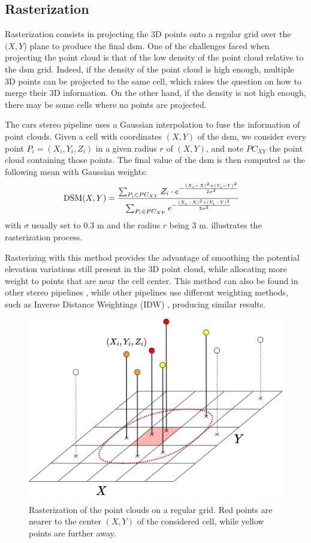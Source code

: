\subsection{Rasterization}\label{sec:rasterization}
Rasterization consists in projecting the 3D points onto a regular grid over the $(X,Y$) plane to produce the final \acrshort{dsm}. One of the challenges faced when projecting the point cloud is that of the low density of the point cloud relative to the \acrshort{dsm} grid. Indeed, if the density of the point cloud is high enough, multiple 3D points can be projected to the same cell, which raises the question on how to merge their 3D information. On the other hand, if the density is not high enough, there may be some cells where no points are projected. 

The \acrshort{cars} stereo pipeline uses a Gaussian interpolation to fuse the information of point clouds. Given a cell with coordinates $(X,Y)$ of the \acrshort{dsm}, we consider every point $P_i=(X_i, Y_i, Z_i)$ in a given radius $r$ of $(X,Y)$, and note $PC_{XY}$ the point cloud containing those points. The final value of the \acrshort{dsm} is then computed as the following mean with Gaussian weights:
\begin{align}\label{eq:rasterization}
    \mathrm{DSM}(X,Y) &= \frac{\sum_{P_i\in PC_{XY}}Z_i\cdot e^{-\frac{(X_i-X)^2+(Y_i-Y)^2}{2\sigma^2}}}{\sum_{P_i\in PC_{XY}} e^{-\frac{(X_i-X)^2+(Y_i-Y)^2}{2\sigma^2}}}
\end{align}
with $\sigma$ usually set to $0.3$ m and the radius $r$ being $3$ m.  illustrates the rasterization process.

Rasterizing with this method provides the advantage of smoothing the potential elevation variations still present in the 3D point cloud, while allocating more weight to points that are near the cell center. This method can also be found in other stereo pipelines \cite{shean_automated_2016}, while other pipelines use different weighting methods, such as Inverse Distance Weightings (IDW) \cite{rupnik_micmac_2017}, producing similar results.

\begin{figure}
    \centering
    \includegraphics[width=0.7\linewidth]{Images/Chap_1/Rasterization.png}
    \caption{Rasterization of the point clouds on a regular grid. Red points are nearer to the center $(X,Y)$ of the considered cell, while yellow points are further away.}
    \label{fig:rasterization}
\end{figure}

